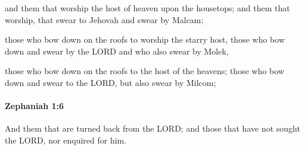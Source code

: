 			\begin{versebox}
					\item[BHS] 
					\item[LXX] 
					\item[ASV] and them that worship the host of heaven upon the housetops; and them that worship, that swear to Jehovah and swear by Malcam;
					\item[NIV] those who bow down on the roofs to worship the starry host, those who bow down and swear by the LORD and who also swear by Molek,
					\item[NRSV] those who bow down on the roofs to the host of the heavens; those who bow down and swear to the LORD, but also swear by Milcom;
			\end{versebox}

		\paragraph{Zephaniah 1:6} %
			\label{ZEPHANIAH-1-6}

			And them that are turned back from the LORD; and those that have not sought the LORD, nor enquired for him.

